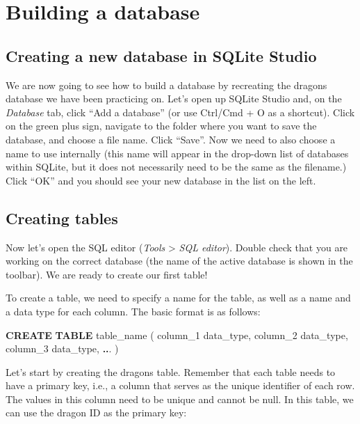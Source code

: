 \documentclass[
]{book}
\newenvironment{Shaded}{\begin{snugshade}}{\end{snugshade}}
\newcommand{\KeywordTok}[1]{\textcolor[rgb]{0.13,0.29,0.53}{\textbf{#1}}}
\newcommand{\NormalTok}[1]{#1}
\newcommand{\OperatorTok}[1]{\textcolor[rgb]{0.81,0.36,0.00}{\textbf{#1}}}
\begin{document}
\hypertarget{building-a-database}{%
\section{Building a database}\label{building-a-database}}

\hypertarget{creating-a-new-database-in-sqlite-studio}{%
\subsection{Creating a new database in SQLite Studio}\label{creating-a-new-database-in-sqlite-studio}}

We are now going to see how to build a database by recreating the dragons
database we have been practicing on. Let's open up SQLite Studio and, on the
\emph{Database} tab, click ``Add a database'' (or use Ctrl/Cmd + O as a shortcut).
Click on the green plus sign, navigate to the folder where you want to save the
database, and choose a file name. Click ``Save''. Now we need to also choose a
name to use internally (this name will appear in the drop-down list of databases
within SQLite, but it does not necessarily need to be the same as the filename.)
Click ``OK'' and you should see your new database in the list on the left.

\hypertarget{creating-tables}{%
\subsection{Creating tables}\label{creating-tables}}

Now let's open the SQL editor (\emph{Tools} \textgreater{} \emph{SQL editor}). Double check that you
are working on the correct database (the name of the active database is shown
in the toolbar). We are ready to create our first table!

To create a table, we need to specify a name for the table, as well as a name
and a data type for each column. The basic format is as follows:

\begin{Shaded}
\begin{Highlighting}[]

\KeywordTok{CREATE} \KeywordTok{TABLE}\NormalTok{ table\_name (}
\NormalTok{column\_1 data\_type,}
\NormalTok{column\_2 data\_type,}
\NormalTok{column\_3 data\_type,}
\OperatorTok{..}\NormalTok{.}
\NormalTok{)}
\end{Highlighting}
\end{Shaded}

Let's start by creating the dragons table. Remember that each table needs to
have a primary key, i.e., a column that serves as the unique identifier of each
row. The values in this column need to be unique and cannot be null. In this
table, we can use the dragon ID as the primary key:
\end{document}
